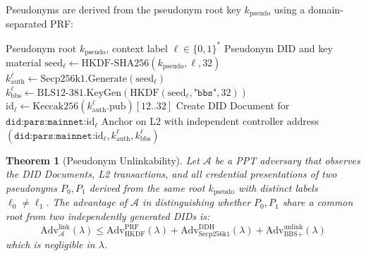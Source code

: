 \documentclass[11pt,a4paper]{article}
\newtheorem{theorem}{Theorem}[section]
\begin{document}
Pseudonyms are derived from the pseudonym root key $k_{\text{pseudo}}$ using a
domain-separated PRF:

\begin{algorithm}[H]
\caption{Pseudonym Derivation}
\label{alg:pseudonym}
\begin{algorithmic}[1]
\Require Pseudonym root $k_{\text{pseudo}}$, context label $\ell \in \{0,1\}^*$
\Ensure Pseudonym DID and key material
    \State $\text{seed}_\ell \gets \text{HKDF-SHA256}(k_{\text{pseudo}}, \ell, 32)$
    \State $k_{\text{auth}}^\ell \gets \text{Secp256k1.Generate}(\text{seed}_\ell)$
    \State $k_{\text{bbs}}^\ell \gets \text{BLS12-381.KeyGen}(\text{HKDF}(\text{seed}_\ell, \texttt{"bbs"}, 32))$
    \State $\text{id}_\ell \gets \text{Keccak256}(k_{\text{auth}}^{\ell}.\text{pub})[12..32]$
    \State Create DID Document for $\texttt{did:pars:mainnet:}\text{id}_\ell$
    \State Anchor on L2 with independent controller address
    \Return $(\texttt{did:pars:mainnet:}\text{id}_\ell, k_{\text{auth}}^\ell, k_{\text{bbs}}^\ell)$
\EndFunction
\end{algorithmic}
\end{algorithm}

\begin{theorem}[Pseudonym Unlinkability]
\label{thm:unlinkability}
Let $\mathcal{A}$ be a PPT adversary that observes the DID Documents, L2 transactions,
and all credential presentations of two pseudonyms $P_0, P_1$ derived from the same
root $k_{\text{pseudo}}$ with distinct labels $\ell_0 \neq \ell_1$. The advantage of
$\mathcal{A}$ in distinguishing whether $P_0, P_1$ share a common root from two
independently generated DIDs is:
\[
    \text{Adv}^{\text{link}}_{\mathcal{A}}(\lambda) \leq
    \text{Adv}^{\text{PRF}}_{\text{HKDF}}(\lambda) +
    \text{Adv}^{\text{DDH}}_{\text{Secp256k1}}(\lambda) +
    \text{Adv}^{\text{unlink}}_{\text{BBS+}}(\lambda)
\]
which is negligible in $\lambda$.
\end{theorem}
\end{document}
